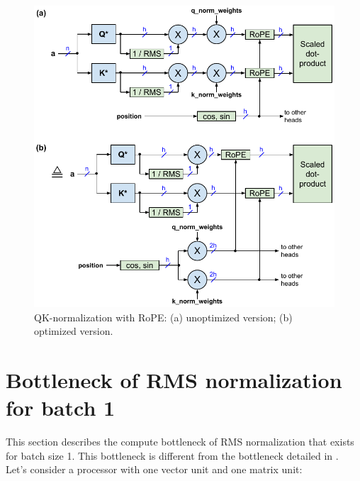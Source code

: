 \documentclass{article}
\numberwithin{equation}{section} %
\begin{document}
\begin{figure}[h!] \centering
  \includegraphics[scale=0.9]{../doc/fig/flashNorm_fig7.pdf}
  \caption{QK-normalization with RoPE: (a) unoptimized version; (b) optimized version.}
\label{fig7} \end{figure}

\section{Bottleneck of RMS normalization for batch 1}
This section describes the compute bottleneck of RMS normalization that exists for batch size 1. This bottleneck is different from the bottleneck detailed in \citep{openelm}. Let’s consider a processor with one vector unit and one matrix unit:
\end{document}
